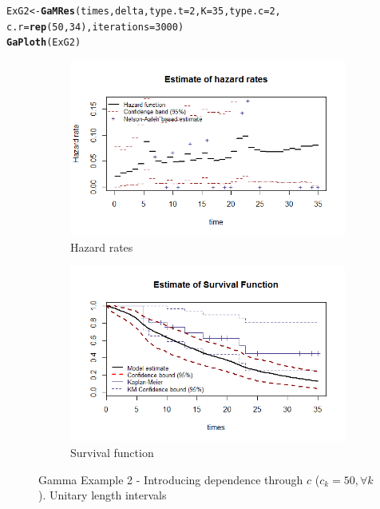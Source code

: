\documentclass[letterpaper]{article}\usepackage[]{graphicx}\usepackage[]{color}
\makeatletter
\newcommand{\hlnum}[1]{\textcolor[rgb]{0.686,0.059,0.569}{#1}}%
\newcommand{\hlstd}[1]{\textcolor[rgb]{0.345,0.345,0.345}{#1}}%
\newcommand{\hlkwb}[1]{\textcolor[rgb]{0.69,0.353,0.396}{#1}}%
\newcommand{\hlkwc}[1]{\textcolor[rgb]{0.333,0.667,0.333}{#1}}%
\newcommand{\hlkwd}[1]{\textcolor[rgb]{0.737,0.353,0.396}{\textbf{#1}}}%
\newenvironment{kframe}{%
 \def\at@end@of@kframe{}%
 \ifinner\ifhmode%
  \def\at@end@of@kframe{\end{minipage}}%
  \begin{minipage}{\columnwidth}%
 \fi\fi%
 \def\FrameCommand##1{\hskip\@totalleftmargin \hskip-\fboxsep
 \colorbox{shadecolor}{##1}\hskip-\fboxsep
     \hskip-\linewidth \hskip-\@totalleftmargin \hskip\columnwidth}%
 \MakeFramed {\advance\hsize-\width
   \@totalleftmargin\z@ \linewidth\hsize
   \@setminipage}}%
 {\par\unskip\endMakeFramed%
 \at@end@of@kframe}
\newenvironment{knitrout}{}{} %
\makeatother
\begin{document}
\begin{knitrout}
\color{fgcolor}\begin{kframe}
\begin{alltt}
\hlstd{ExG2} \hlkwb{<-} \hlkwd{GaMRes}\hlstd{(times, delta,} \hlkwc{type.t} \hlstd{=} \hlnum{2}\hlstd{,} \hlkwc{K} \hlstd{=} \hlnum{35}\hlstd{,} \hlkwc{type.c} \hlstd{=} \hlnum{2}\hlstd{,}
               \hlkwc{c.r} \hlstd{=} \hlkwd{rep}\hlstd{(}\hlnum{50}\hlstd{,} \hlnum{34}\hlstd{),} \hlkwc{iterations} \hlstd{=} \hlnum{3000}\hlstd{)}
\hlkwd{GaPloth}\hlstd{(ExG2)}
\end{alltt}
\end{kframe}
\end{knitrout}
\begin{figure}
  \centering
  \begin{subfigure}[a]{\textwidth}\centering
    \includegraphics[width=\textwidth]{G21.png}
    \caption{Hazard rates}
  \end{subfigure}
  \begin{subfigure}[b]{\textwidth}\centering
    \includegraphics[width=\textwidth]{G22.png}
    \caption{Survival function}
  \end{subfigure}
  \caption{Gamma Example 2 - Introducing dependence through $c$ ($c_k=50, \forall k$). Unitary length intervals}
  \label{fig:G2}
\end{figure}
\end{document}
